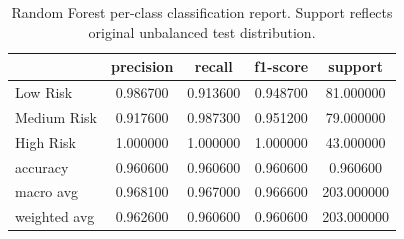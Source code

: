\begin{table}[h]
\caption{Random Forest per-class classification report. Support reflects original unbalanced test distribution.}
\label{tab:rf_report}
\begin{tabular}{lcccc}
\toprule
 & precision & recall & f1-score & support \\
\midrule
Low Risk & 0.986700 & 0.913600 & 0.948700 & 81.000000 \\
Medium Risk & 0.917600 & 0.987300 & 0.951200 & 79.000000 \\
High Risk & 1.000000 & 1.000000 & 1.000000 & 43.000000 \\
accuracy & 0.960600 & 0.960600 & 0.960600 & 0.960600 \\
macro avg & 0.968100 & 0.967000 & 0.966600 & 203.000000 \\
weighted avg & 0.962600 & 0.960600 & 0.960600 & 203.000000 \\
\bottomrule
\end{tabular}
\end{table}
